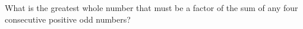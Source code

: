 What is the greatest whole number that must be a factor of the sum of any four consecutive positive odd numbers?
